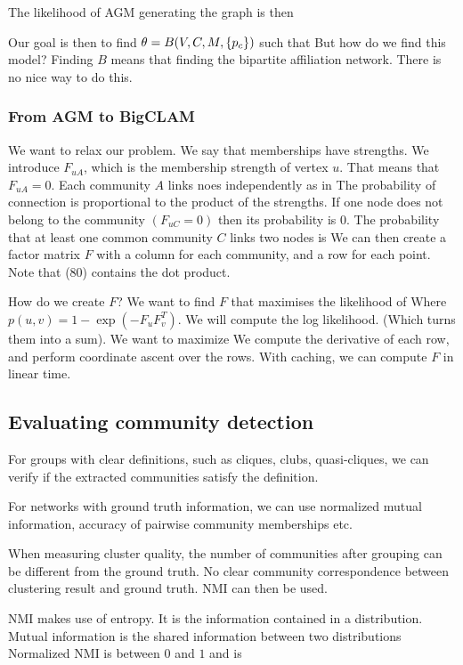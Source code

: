     The likelihood of AGM generating the graph is then
    
    Our goal is then to find $\theta = B(V, C, M, \{p_c\})$ such that
    But how do we find this model? Finding $B$ means that finding the bipartite affiliation network. There is no nice way to do this. 
    
\subsubsection{From AGM to BigCLAM}
    We want to relax our problem. We say that memberships have strengths. We introduce $F_{uA}$, which is the membership strength of vertex $u$. That means that $F_{uA} = 0$. Each community $A$ links noes independently as in 
    The probability of connection is proportional to the product of the strengths. If one node does not belong to the community $(F_{uC} = 0)$ then its probability is $0$. The probability that at least one common community $C$ links two nodes is 
    We can then create a factor matrix $F$ with a column for each community, and a row for each point. Note that (80) contains the dot product. 
    
    How do we create $F$? We want to find $F$ that maximises the likelihood of 
    Where $p(u, v) = 1 - \exp(-F_u F_v^T)$. We will compute the log likelihood. (Which turns them into a sum). We want to maximize
    We compute the derivative of each row, and perform coordinate ascent over the rows. With caching, we can compute $F$ in linear time.
    
\subsection{Evaluating community detection}
For groups with clear definitions, such as cliques, clubs, quasi-cliques, we can verify if the extracted communities satisfy the definition.

For networks with ground truth information, we can use normalized mutual information, accuracy of pairwise community memberships etc.

When measuring cluster quality, the number of communities after grouping can be different from the ground truth. No clear community correspondence between clustering result and ground truth. NMI can then be used. 

NMI makes use of entropy. It is the information contained in a distribution.
Mutual information is the shared information between two distributions
Normalized NMI is between $0$ and $1$ and is
    
    
    